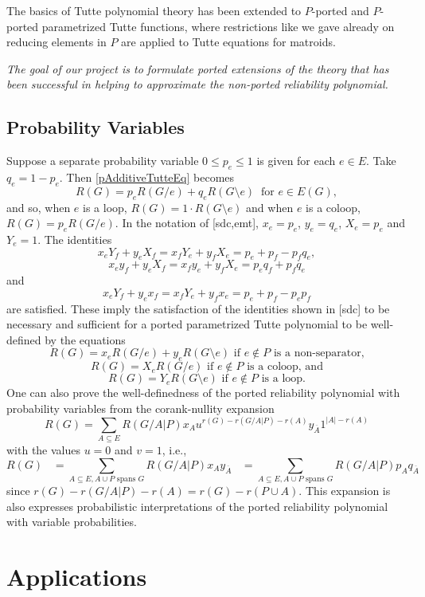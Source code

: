 \documentclass[12pt,leqno]{amsart}
\theoremstyle{remark}
\newcommand{\scomp}[1]{\ensuremath{\overline{#1}}}
\begin{document}
The basics of Tutte polynomial theory has been extended to
$P$-ported and $P$-ported parametrized Tutte functions, where
restrictions like we gave already on reducing elements in $P$ 
are applied to Tutte equations for matroids.  

\emph{The goal of our project is to formulate ported extensions of
the theory that has been successful in helping to
approximate the non-ported reliability polynomial.}

\subsection{Probability Variables}

Suppose a separate probability variable $0\le p_e \le 1$ is given
for each $e\in E$.  Take $q_e = 1 - p_e$.  Then \eqref{pAdditiveTutteEq} 
becomes
\begin{equation}
\label{ParampAdditiveTutteEq}
R(G)=p_eR(G/e)+q_eR(G\setminus e)\;\;\text{for }e\in E(G),
\end{equation}
and so, when $e$ is a loop, $R(G)=1\cdot R(G\setminus e)$ and
when $e$ is a coloop, $R(G)=p_e R(G/ e)$.  In the notation of
[sdc,emt], $x_e=p_e$, $y_e=q_e$, $X_e=p_e$ and $Y_e=1$.  The
identities 
\[
x_eY_f+y_eX_f = x_fY_e+ y_fX_e = p_e+p_f-p_fq_e,
\]
\[
x_ey_f+y_eX_f = x_fy_e+ y_fX_e = p_eq_f+p_fq_e
\]
and 
\[
x_eY_f+y_ex_f = x_fY_e+y_fx_e = p_e + p_f - p_ep_f
\]
are satisfied.  These imply the satisfaction of the 
identities shown in [sdc] to be necessary and sufficient
for a ported parametrized Tutte polynomial to be well-defined
by the equations
\[
R(G) = x_e R(G/e) + y_e R(G\setminus e)\text{ if }e\not\in P
\text{ is a non-separator,}
\]
\[
R(G) = X_e R(G/e)\text{ if }e\not\in P\text{ is a coloop, and}
\]
\[
R(G) = Y_e R(G\setminus e)\text{ if }e\not\in P\text{ is a loop.}
\]
One can also prove the well-definedness of the ported
reliability polynomial with probability variables from the
corank-nullity expansion
\[
R(G)=\sum_{A\subseteq E}R(G/A|P)
x_Au^{r(G)-r(G/A|P)-r(A)}
y_{\scomp{A}}1^{|A|-r(A)}
\]
with the values $u=0$ and $v=1$, i.e.,
\[
\label{PortedVarProb}
R(G)\;\;\;=\sum_{A\subseteq E, A\cup P \text{ spans }G}
R(G/A|P)
x_A
y_{\scomp{A}}
\;\;\;=
\sum_{A\subseteq E, A\cup P \text{ spans }G}
R(G/A|P)
p_A
q_{\scomp{A}}
\]
since 
$r(G)-r(G/A|P)-r(A)=r(G)-r(P\cup A)$.  This expansion is also expresses
probabilistic interpretations of the ported reliability polynomial
with variable probabilities.

\section{Applications}
\end{document}
